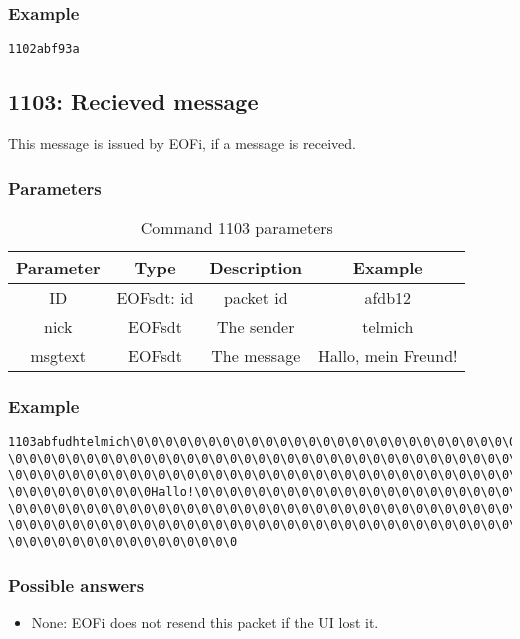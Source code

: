 \subsubsection{Example}
\begin{verbatim}
1102abf93a
\end{verbatim}
\subsection{1103: Recieved message}
This message is issued by EOFi, if a message is received.
\subsubsection{Parameters}
\begin{longtable}{|c|c|c|c|}
\caption{Command 1103 parameters}\\
\hline
\textbf{Parameter} & \textbf{Type} & \textbf{Description} & \textbf{Example}\\
\hline
ID & EOFsdt: id & packet id & afdb12\\
\hline
nick & EOFsdt & The sender & telmich\\
\hline
msgtext & EOFsdt & The message & Hallo, mein Freund!\\
\hline
\end{longtable}
\subsubsection{Example}
\begin{verbatim}
1103abfudhtelmich\0\0\0\0\0\0\0\0\0\0\0\0\0\0\0\0\0\0\0\0\0\0\0\0\0\0\0\0\0
\0\0\0\0\0\0\0\0\0\0\0\0\0\0\0\0\0\0\0\0\0\0\0\0\0\0\0\0\0\0\0\0\0\0\0\0\0
\0\0\0\0\0\0\0\0\0\0\0\0\0\0\0\0\0\0\0\0\0\0\0\0\0\0\0\0\0\0\0\0\0\0\0\0\0
\0\0\0\0\0\0\0\0\0\0Hallo!\0\0\0\0\0\0\0\0\0\0\0\0\0\0\0\0\0\0\0\0\0\0\0\0
\0\0\0\0\0\0\0\0\0\0\0\0\0\0\0\0\0\0\0\0\0\0\0\0\0\0\0\0\0\0\0\0\0\0\0\0\0
\0\0\0\0\0\0\0\0\0\0\0\0\0\0\0\0\0\0\0\0\0\0\0\0\0\0\0\0\0\0\0\0\0\0\0\0\0
\0\0\0\0\0\0\0\0\0\0\0\0\0\0\0\0
\end{verbatim}
\subsubsection{Possible answers}
\begin{itemize}
\item None: EOFi does not resend this packet if the UI lost it.
\end{itemize}
